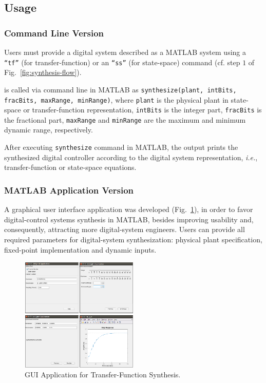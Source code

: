 \subsection{\tool Usage}

\subsubsection{Command Line Version}

Users must provide a digital system described as a MATLAB system  using a \texttt{``tf''} (for transfer-function) or an \texttt{``ss''} (for state-space) command (cf. step $1$ of Fig.~\ref{fig:synthesis-flow}).

\tool is called via command line in MATLAB as \texttt{synthesize(plant, intBits, fracBits, maxRange, minRange)}, where \texttt{plant} is the physical plant in state-space or transfer-function representation, \texttt{intBits} is the integer part, \texttt{fracBits} is the fractional part, \texttt{maxRange} and \texttt{minRange} are the maximum and minimum dynamic range, respectively.

After executing \texttt{synthesize} command in MATLAB, the output prints the synthesized digital controller according to the digital system representation, {\it i.e.}, transfer-function or state-space equations. 

\subsubsection{MATLAB Application Version} 

A graphical user interface application was developed (Fig.~\ref{fig:gui-for-tf}), in order to favor digital-control systems synthesis in MATLAB, besides improving usability and, consequently, attracting more digital-system engineers. Users can provide all required parameters for digital-system synthesization: physical plant specification, fixed-point implementation and dynamic inputs. 
%
\begin{figure}
  \includegraphics[width=0.5\textwidth]{screens_dssynth.png}
  \caption{GUI Application for Transfer-Function Synthesis.}
  \label{fig:gui-for-tf}
\end{figure}


